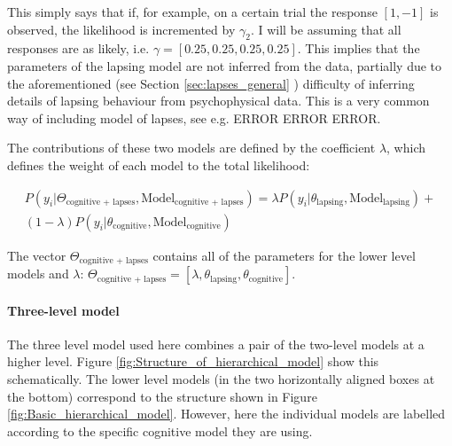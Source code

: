 \documentclass{article}\usepackage{knitr}
\begin{document}
This simply says that if, for example, on a certain trial the response $[1,-1]$ is observed, the likelihood is incremented by $\gamma_2$. I will be assuming that all responses are as likely, i.e. $\gamma = [0.25, 0.25, 0.25, 0.25]$. This implies that the parameters of the lapsing model are not inferred from the data, partially due to the aforementioned (see Section \ref{sec:lapses_general} \textit{}) difficulty of inferring details of lapsing behaviour from psychophysical data. This is a very common way of including model of lapses, see e.g. ERROR ERROR ERROR.

The contributions of these two models are defined by the coefficient $\lambda$, which defines the weight of each model to the total likelihood:

\begin{multline}
\label{eq:lower_level_hiera}
P(y_i |\Theta_{\text{cognitive + lapses}}, \text{Model}_{\text{cognitive + lapses}}) = \lambda P(y_i | \theta_{\text{lapsing}}, \text{Model}_{\text{lapsing}}) + \\ (1 - \lambda) P(y_i | \theta_{\text{cognitive}}, \text{Model}_{\text{cognitive}})
\end{multline}

The vector $\Theta_{\text{cognitive + lapses}}$ contains all of the parameters for the lower level models and $\lambda$: $\Theta_{\text{cognitive + lapses}} = [\lambda, \theta_{\text{lapsing}}, \theta_{\text{cognitive}}]$.

\paragraph{Three-level model}

The three level model used here combines a pair of the two-level models at a higher level. Figure \ref{fig:Structure_of_hierarchical_model} show this schematically. The lower level models (in the two horizontally aligned boxes at the bottom) correspond to the structure shown in Figure \ref{fig:Basic_hierarchical_model}. However, here the individual models are labelled according to the specific cognitive model they are using. 
\end{document}
